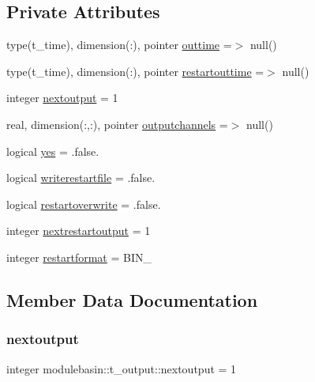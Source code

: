 \subsection*{Private Attributes}
\begin{DoxyCompactItemize}
\item 
type(t\+\_\+time), dimension(\+:), pointer \mbox{\hyperlink{structmodulebasin_1_1t__output_a3167bf81c8c167a8d6d59da861c69090}{outtime}} =$>$ null()
\item 
type(t\+\_\+time), dimension(\+:), pointer \mbox{\hyperlink{structmodulebasin_1_1t__output_a981a8dd8b923f871c7898b623ba76bf3}{restartouttime}} =$>$ null()
\item 
integer \mbox{\hyperlink{structmodulebasin_1_1t__output_a5e54e1cab85b009efa93aa12058d647b}{nextoutput}} = 1
\item 
real, dimension(\+:,\+:), pointer \mbox{\hyperlink{structmodulebasin_1_1t__output_aecfd9090e17595fc3a9e3d7b35b1f9c4}{outputchannels}} =$>$ null()
\item 
logical \mbox{\hyperlink{structmodulebasin_1_1t__output_a59bf81178f4321e9c24db73b820899a1}{yes}} = .false.
\item 
logical \mbox{\hyperlink{structmodulebasin_1_1t__output_aa89ea77a6021f2d36485871f6a41e540}{writerestartfile}} = .false.
\item 
logical \mbox{\hyperlink{structmodulebasin_1_1t__output_a7c1399fe3182a56c9ae832e201c55693}{restartoverwrite}} = .false.
\item 
integer \mbox{\hyperlink{structmodulebasin_1_1t__output_ad3bfa9b274ebcfa927597857aa535b8e}{nextrestartoutput}} = 1
\item 
integer \mbox{\hyperlink{structmodulebasin_1_1t__output_a01928f3c1ffd1be546492f2bfb009069}{restartformat}} = B\+I\+N\+\_\+
\end{DoxyCompactItemize}


\subsection{Member Data Documentation}
\mbox{\label{structmodulebasin_1_1t__output_a5e54e1cab85b009efa93aa12058d647b}} 
\subsubsection{\texorpdfstring{nextoutput}{nextoutput}}
{\footnotesize\ttfamily integer modulebasin\+::t\+\_\+output\+::nextoutput = 1\hspace{0.3cm}{\ttfamily [private]}}

